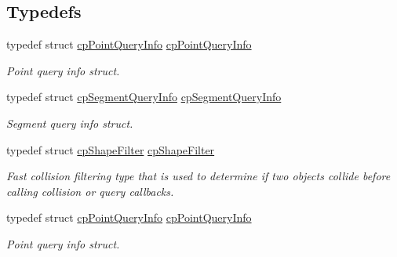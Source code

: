 \subsection*{Typedefs}
\begin{DoxyCompactItemize}
\item 
\mbox{\label{group__cpShape_ga2264ed925aee1f67a414ff773bfe33ff}} 
typedef struct \hyperlink{structcpPointQueryInfo}{cp\+Point\+Query\+Info} \hyperlink{group__cpShape_ga2264ed925aee1f67a414ff773bfe33ff}{cp\+Point\+Query\+Info}
\begin{DoxyCompactList}\small\item\em Point query info struct. \end{DoxyCompactList}\item 
\mbox{\label{group__cpShape_gadebeb6b5e42d369df368fd220aacd7e8}} 
typedef struct \hyperlink{structcpSegmentQueryInfo}{cp\+Segment\+Query\+Info} \hyperlink{group__cpShape_gadebeb6b5e42d369df368fd220aacd7e8}{cp\+Segment\+Query\+Info}
\begin{DoxyCompactList}\small\item\em Segment query info struct. \end{DoxyCompactList}\item 
\mbox{\label{group__cpShape_gaa85aa81b58edce2acc7e06316d11875c}} 
typedef struct \hyperlink{structcpShapeFilter}{cp\+Shape\+Filter} \hyperlink{group__cpShape_gaa85aa81b58edce2acc7e06316d11875c}{cp\+Shape\+Filter}
\begin{DoxyCompactList}\small\item\em Fast collision filtering type that is used to determine if two objects collide before calling collision or query callbacks. \end{DoxyCompactList}\item 
\mbox{\label{group__cpShape_ga2264ed925aee1f67a414ff773bfe33ff}} 
typedef struct \hyperlink{structcpPointQueryInfo}{cp\+Point\+Query\+Info} \hyperlink{group__cpShape_ga2264ed925aee1f67a414ff773bfe33ff}{cp\+Point\+Query\+Info}
\begin{DoxyCompactList}\small\item\em Point query info struct. \end{DoxyCompactList}\item 
\mbox{\label{group__cpShape_gadebeb6b5e42d369df368fd220aacd7e8}} 

\end{DoxyCompactItemize}
